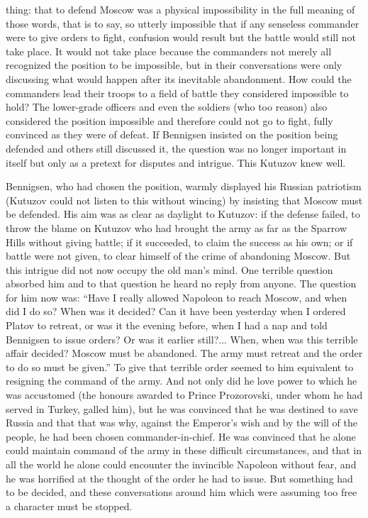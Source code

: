 thing: that to defend Moscow was a physical impossibility in the
full meaning of those words, that is to say, so utterly
impossible that if any senseless commander were to give orders to
fight, confusion would result but the battle would still not take
place. It would not take place because the commanders not merely
all recognized the position to be impossible, but in their
conversations were only discussing what would happen after its
inevitable abandonment. How could the commanders lead their
troops to a field of battle they considered impossible to hold?
The lower-grade officers and even the soldiers (who too reason)
also considered the position impossible and therefore could not
go to fight, fully convinced as they were of defeat. If Bennigsen
insisted on the position being defended and others still
discussed it, the question was no longer important in itself but
only as a pretext for disputes and intrigue.  This Kutuzov knew
well.

Bennigsen, who had chosen the position, warmly displayed his
Russian patriotism (Kutuzov could not listen to this without
wincing) by insisting that Moscow must be defended. His aim was
as clear as daylight to Kutuzov: if the defense failed, to throw
the blame on Kutuzov who had brought the army as far as the
Sparrow Hills without giving battle; if it succeeded, to claim
the success as his own; or if battle were not given, to clear
himself of the crime of abandoning Moscow. But this intrigue did
not now occupy the old man's mind. One terrible question absorbed
him and to that question he heard no reply from anyone. The
question for him now was: ``Have I really allowed Napoleon to
reach Moscow, and when did I do so? When was it decided? Can it
have been yesterday when I ordered Platov to retreat, or was it
the evening before, when I had a nap and told Bennigsen to issue
orders? Or was it earlier still?... When, when was this terrible
affair decided? Moscow must be abandoned. The army must retreat
and the order to do so must be given.'' To give that terrible
order seemed to him equivalent to resigning the command of the
army. And not only did he love power to which he was accustomed
(the honours awarded to Prince Prozorovski, under whom he had
served in Turkey, galled him), but he was convinced that he was
destined to save Russia and that that was why, against the
Emperor's wish and by the will of the people, he had been chosen
commander-in-chief. He was convinced that he alone could maintain
command of the army in these difficult circumstances, and that in
all the world he alone could encounter the invincible Napoleon
without fear, and he was horrified at the thought of the order he
had to issue. But something had to be decided, and these
conversations around him which were assuming too free a character
must be stopped.

